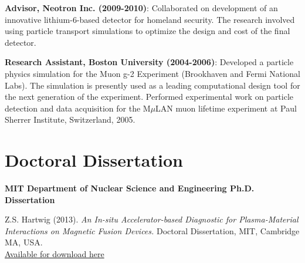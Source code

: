 \documentclass[10pt]{article}
\begin{document}
\begin{innerlist}
\item \textbf{Advisor, Neotron Inc. (2009-2010)}: Collaborated on
  development of an innovative lithium-6-based detector for homeland
  security. The research involved using particle transport simulations
  to optimize the design and cost of the final detector.\vspace{0.2cm}

\item \textbf{Research Assistant, Boston University (2004-2006)}:
  Developed a particle physics simulation for the Muon g-2 Experiment
  (Brookhaven and Fermi National Labs).  The simulation is presently
  used as a leading computational design tool for the next generation
  of the experiment. Performed experimental work on particle detection
  and data acquisition for the M$\mu$LAN muon lifetime experiment at
  Paul Sherrer Institute, Switzerland, 2005.
\end{innerlist}

\newpage
{}

\section{Doctoral Dissertation}
\textbf{MIT Department of Nuclear Science and Engineering Ph.D. Dissertation}
\begin{innerlist}
\item Z.S. Hartwig (2013). \textit{An In-situ Accelerator-based Diagnostic
  for Plasma-Material Interactions on Magnetic Fusion Devices.}
Doctoral Dissertation, MIT, Cambridge MA,
USA.\\ \href{http://www.psfc.mit.edu/library1/catalog/reports/2010/13rr/13rr012/13rr012_full.pdf}{Available
  for download here}
\end{innerlist}
\end{document}
